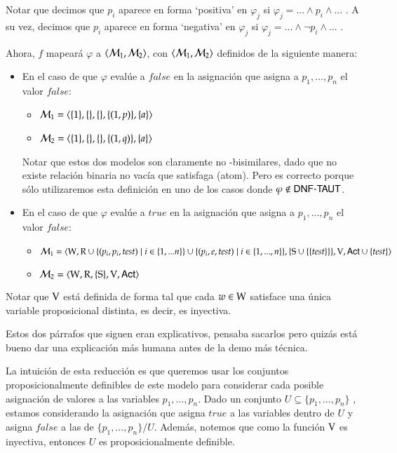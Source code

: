 \begin{demostracion}
    Notar que decimos que $p_i$ aparece en forma `positiva' en $\varphi_j$ si $\varphi_j = ... \wedge p_i \wedge...$ . A su vez, decimos que $p_i$ aparece en forma `negativa' en $\varphi_j$ si $\varphi_j = ...\wedge \neg p_i \wedge...$ .

    Ahora, $f$ mapeará $\varphi$ a $\langle \mathcal{M}_1,\mathcal{M}_2 \rangle$, con $\langle \mathcal{M}_1,\mathcal{M}_2 \rangle$ definidos de la siguiente manera:

    \begin{itemize}
        \item En el caso de que $\varphi$ evalúe a $false$ en la asignación que asigna a $p_1,...,p_n$ el valor $false$:

        \begin{itemize}
            \item $\mathcal{M}_1=\langle \{1\},\{\},\{\},\{(1,p)\},\{a\} \rangle$
            \item $\mathcal{M}_2=\langle \{1\},\{\},\{\},\{(1,q)\},\{a\} \rangle$
        \end{itemize}

        Notar que estos dos modelos son claramente no \KHilogic-bisimilares, dado que no existe relación binaria no vacía que satisfaga (atom). Pero es correcto porque sólo utilizaremos esta definición en uno de los casos donde $\varphi \not \in \rm\textsf{DNF-TAUT}$. 
        
        \item En el caso de que $\varphi$ evalúe a $true$ en la asignación que asigna a $p_1,...,p_n$ el valor $false$:
        
        \begin{itemize}
            \item $\mathcal{M}_1=\langle \mathrm{W},\mathrm{R} \cup \{(p_i,p_i,test) \mid i \in \{1,...n\}\} \cup \{(p_i,e,test)\mid i \in \{1,...,n\}\},\{\mathrm{S} \cup \{\{test\}\} \},\mathrm{V},{\rm \sf Act} \cup \{test\} \rangle$
            \item $\mathcal{M}_2=\langle \mathrm{W},\mathrm{R},\{ \mathrm{S} \},\mathrm{V},{\rm \sf Act} \rangle$
        \end{itemize}
    \end{itemize}

    
    Notar que $\mathrm{V}$ está definida de forma tal que cada $w\in\mathrm{W}$ satisface una única variable proposicional distinta, es decir, es inyectiva.


\medskip\medskip
    Estos dos párrafos que siguen eran explicativos, pensaba sacarlos pero quizás está bueno dar una explicación más humana antes de la demo más técnica.

    La intuición de esta reducción es que queremos usar los conjuntos proposicionalmente definibles de este modelo para considerar cada posible asignación de valores a las variables $p_1,...,p_n$. Dado un conjunto $U \subseteq \{p_1,...,p_n\}$ , estamos considerando la asignación que asigna $true$ a las variables dentro de $U$ y asigna $false$ a las de $\{p_1,...,p_n\}/U$. Además, notemos que como la función $\mathrm{V}$ es inyectiva, entonces $U$ es proposicionalmente definible.
 

\end{demostracion}
